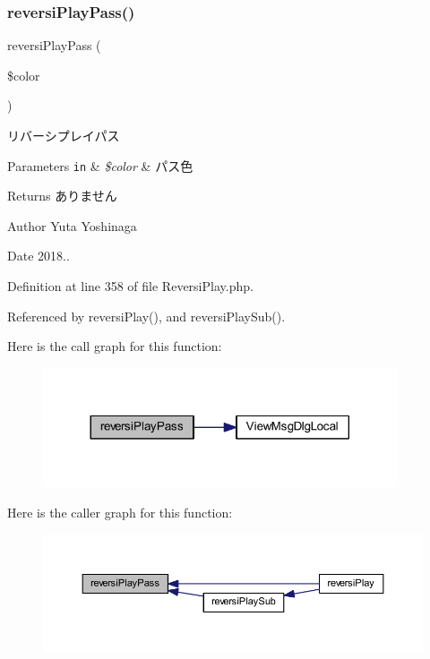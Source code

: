 \subsubsection{\texorpdfstring{reversi\+Play\+Pass()}{reversiPlayPass()}}
{\footnotesize\ttfamily reversi\+Play\+Pass (\begin{DoxyParamCaption}\item[{}]{\$color }\end{DoxyParamCaption})}



リバーシプレイパス 


\begin{DoxyParams}[1]{Parameters}
\mbox{\tt in}  & {\em \$color} & パス色 \\
\hline
\end{DoxyParams}
\begin{DoxyReturn}{Returns}
ありません 
\end{DoxyReturn}
\begin{DoxyAuthor}{Author}
Yuta Yoshinaga 
\end{DoxyAuthor}
\begin{DoxyDate}{Date}
2018.. 
\end{DoxyDate}


Definition at line 358 of file Reversi\+Play.\+php.



Referenced by reversi\+Play(), and reversi\+Play\+Sub().

Here is the call graph for this function\+:\nopagebreak
\begin{figure}[H]
\begin{center}
\leavevmode
\includegraphics[width=296pt]{class_reversi_play_a67816fe65a87e35d8e8cc35d5d269bcb_cgraph}
\end{center}
\end{figure}
Here is the caller graph for this function\+:\nopagebreak
\begin{figure}[H]
\begin{center}
\leavevmode
\includegraphics[width=350pt]{class_reversi_play_a67816fe65a87e35d8e8cc35d5d269bcb_icgraph}
\end{center}
\end{figure}
\mbox{\label{class_reversi_play_a990fc6e45b7bdf2dab569f087f8b5a62}} 

